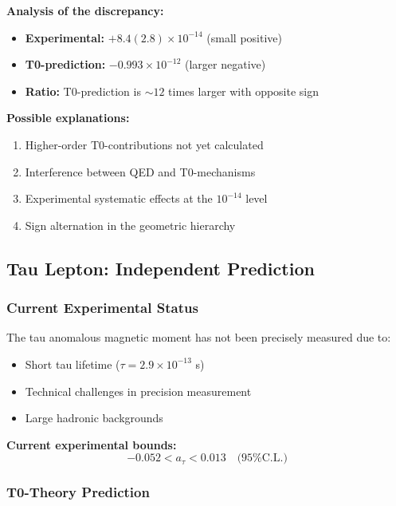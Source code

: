 \documentclass[12pt,a4paper]{article}
\numberwithin{equation}{section}
\begin{document}
	\textbf{Analysis of the discrepancy:}
	\begin{itemize}
		\item \textbf{Experimental:} $+8.4(2.8) \times 10^{-14}$ (small positive)
		\item \textbf{T0-prediction:} $-0.993 \times 10^{-12}$ (larger negative)
		\item \textbf{Ratio:} T0-prediction is $\sim 12$ times larger with opposite sign
	\end{itemize}
	
	\textbf{Possible explanations:}
	\begin{enumerate}
		\item Higher-order T0-contributions not yet calculated
		\item Interference between QED and T0-mechanisms
		\item Experimental systematic effects at the $10^{-14}$ level
		\item Sign alternation in the geometric hierarchy
	\end{enumerate}
	
	\subsection{Tau Lepton: Independent Prediction}
	
	\subsubsection{Current Experimental Status}
	
	The tau anomalous magnetic moment has not been precisely measured due to:
	\begin{itemize}
		\item Short tau lifetime ($\tau = 2.9 \times 10^{-13}$ s)
		\item Technical challenges in precision measurement
		\item Large hadronic backgrounds
	\end{itemize}
	
	\textbf{Current experimental bounds:}
	\begin{equation}
		-0.052 < a_\tau < 0.013 \quad \text{(95\% C.L.)}
		\label{eq:tau_experimental_bounds}
	\end{equation}
	
	\subsubsection{T0-Theory Prediction}
	
\end{document}

